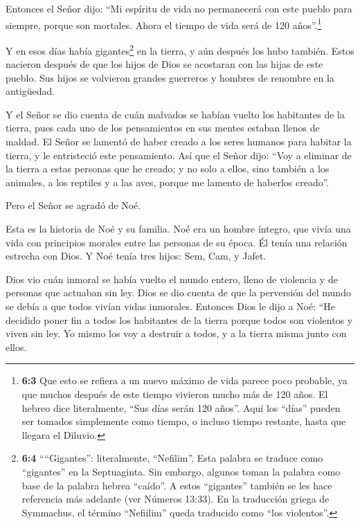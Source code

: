  Entonces el Señor dijo: ``Mi espíritu de vida no
permanecerá con este pueblo para siempre, porque son mortales. Ahora el
tiempo de vida será de 120 años''.\footnote{\textbf{6:3} Que esto se
  refiera a un nuevo máximo de vida parece poco probable, ya que muchos
  después de este tiempo vivieron mucho más de 120 años. El hebreo dice
  literalmente, ``Sus días serán 120 años''. Aquí los ``días'' pueden
  ser tomados simplemente como tiempo, o incluso tiempo restante, hasta
  que llegara el Diluvio.}

 Y en esos días había gigantes\footnote{\textbf{6:4}
  ````Gigantes'': literalmente, ``Nefilim''. Esta palabra se traduce
  como ``gigantes'' en la Septuaginta. Sin embargo, algunos toman la
  palabra como base de la palabra hebrea ``caído''. A estos ``gigantes''
  también se les hace referencia más adelante (ver Números 13:33). En la
  traducción griega de Symmachus, el término ``Nefiilim'' queda
  traducido como ``los violentos''.} en la tierra, y aún después los
hubo también. Estos nacieron después de que los hijos de Dios se
acostaran con las hijas de este pueblo. Sus hijos se volvieron grandes
guerreros y hombres de renombre en la antigüedad.

 Y el Señor se dio cuenta de cuán malvados se habían vuelto
los habitantes de la tierra, pues cada uno de los pensamientos en sus
mentes estaban llenos de maldad.  El Señor se lamentó de
haber creado a los seres humanos para habitar la tierra, y le
entristeció este pensamiento.  Así que el Señor dijo: ``Voy
a eliminar de la tierra a estas personas que he creado; y no solo a
ellos, sino también a los animales, a los reptiles y a las aves, porque
me lamento de haberlos creado''.

 Pero el Señor se agradó de Noé.

 Esta es la historia de Noé y su familia. Noé era un hombre
íntegro, que vivía una vida con principios morales entre las personas de
su época. Él tenía una relación estrecha con Dios.  Y Noé
tenía tres hijos: Sem, Cam, y Jafet.

 Dios vio cuán inmoral se había vuelto el mundo entero,
lleno de violencia y de personas que actuaban sin ley. 
Dios se dio cuenta de que la perversión del mundo se debía a que todos
vivían vidas inmorales.  Entonces Dios le dijo a Noé: ``He
decidido poner fin a todos los habitantes de la tierra porque todos son
violentos y viven sin ley. Yo mismo los voy a destruir a todos, y a la
tierra misma junto con ellos.

